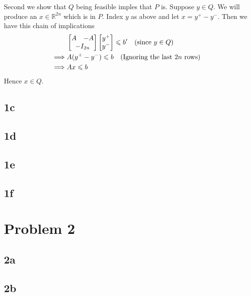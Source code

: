 \documentclass{article}
\begin{document}
Second we show that $Q$ being feasible imples that $P$ is. Suppose $y\in Q$. We will produce an $x \in \mathbb{R}^{2n}$ which is in $P$. Index $y$ as above and let $x = y^+ - y^-$. Then we have this chain of implications
\begin{align*}
&\begin{bmatrix} A & -A \\ \multicolumn{2}{c}{-I_{2n}} \end{bmatrix} \begin{bmatrix} y^+ \\ y^- \end{bmatrix} \leqslant b' \quad \text{(since $y \in Q$)}\\
\implies & A(y^+ - y^-) \leqslant b \quad \text{(Ignoring the last $2n$ rows)}\\
\implies & Ax \leqslant b
\end{align*}
Hence $x \in Q$.

\subsection*{1c}
\subsection*{1d}
\subsection*{1e}
\subsection*{1f}
\section*{Problem 2}
\subsection*{2a}
\subsection*{2b}
\end{document}
